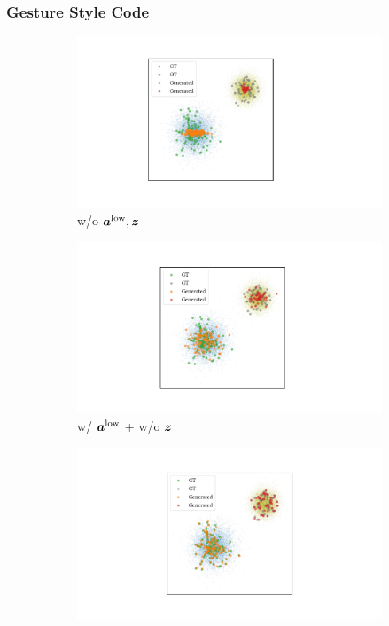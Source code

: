 \subsubsection{Gesture Style Code}
\label{subsubsec:gesture_style_code}
%
\begin{figure}[t]
    \centering
    \begin{subfigure}[t]{0.32\linewidth}
        \centering
        \includegraphics[width=\linewidth]{figures/fig15a.pdf}
        \caption{w/o $\bm{a}^{{\text{low}}},\bm{z}$}
        \label{fig:fig15a}
    \end{subfigure} 
    \hspace{\fill}
    \begin{subfigure}[t]{0.32\linewidth}
        \centering
        \includegraphics[width=\linewidth]{figures/fig15b.pdf}
        \caption{w/ $\bm{a}^{{\text{low}}}$ + w/o $\bm{z}$}
        \label{fig:fig15b}
    \end{subfigure} 
    \hspace{\fill}
    \begin{subfigure}[t]{0.32\linewidth}
        \centering
        \includegraphics[width=\linewidth]{figures/fig15c.pdf}

\end{subfigure}
\end{figure}
